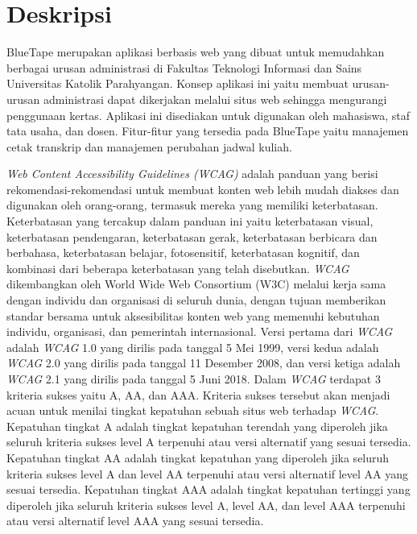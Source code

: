 \documentclass[a4paper,twoside]{article}
\begin{document}
\title{\@judultopik}
\author{\nama \textendash \@npm} 

\newcommand{\nama}{Hizkia Steven}
\newcommand{\@npm}{2015730020}
\newcommand{\@judultopik}{Kepatuhan dan Rekomendasi Perbaikan Web Content Accessibility Guideline untuk Aplikasi BlueTape} %
\newcommand{\jumpemb}{1} %
\newcommand{\tanggal}{25/08/2019}


\maketitle


\section{Deskripsi}
BlueTape merupakan aplikasi berbasis web yang dibuat untuk memudahkan berbagai urusan administrasi di Fakultas Teknologi Informasi dan Sains Universitas Katolik Parahyangan. Konsep aplikasi ini yaitu membuat urusan-urusan administrasi dapat dikerjakan melalui situs web sehingga mengurangi penggunaan kertas. Aplikasi ini disediakan untuk digunakan oleh mahasiswa, staf tata usaha, dan dosen. Fitur-fitur yang tersedia pada BlueTape yaitu manajemen cetak transkrip dan manajemen perubahan jadwal kuliah.

\textit{Web Content Accessibility Guidelines (WCAG)} adalah panduan yang berisi rekomendasi-rekomendasi untuk membuat konten web lebih mudah diakses dan digunakan oleh orang-orang, termasuk mereka yang memiliki keterbatasan. Keterbatasan yang tercakup dalam panduan ini yaitu keterbatasan visual, keterbatasan pendengaran, keterbatasan gerak, keterbatasan berbicara dan berbahasa, keterbatasan belajar, fotosensitif, keterbatasan kognitif, dan kombinasi dari beberapa keterbatasan yang telah disebutkan. \textit{WCAG} dikembangkan oleh World Wide Web Consortium (W3C) melalui kerja sama dengan individu dan organisasi di seluruh dunia, dengan tujuan memberikan standar bersama untuk aksesibilitas konten web yang memenuhi kebutuhan individu, organisasi, dan pemerintah internasional. Versi pertama dari \textit{WCAG} adalah \textit{WCAG} 1.0 yang dirilis pada tanggal 5 Mei 1999, versi kedua adalah \textit{WCAG} 2.0 yang dirilis pada tanggal 11 Desember 2008, dan versi ketiga adalah \textit{WCAG} 2.1 yang dirilis pada tanggal 5 Juni 2018. Dalam \textit{WCAG} terdapat 3 kriteria sukses yaitu A, AA, dan AAA. Kriteria sukses tersebut akan menjadi acuan untuk menilai tingkat kepatuhan sebuah situs web terhadap \textit{WCAG}. Kepatuhan tingkat A adalah tingkat kepatuhan terendah yang diperoleh jika seluruh kriteria sukses level A terpenuhi atau versi alternatif yang sesuai tersedia. Kepatuhan tingkat AA adalah tingkat kepatuhan yang diperoleh jika seluruh kriteria sukses level A dan level AA terpenuhi atau versi alternatif level AA yang sesuai tersedia. Kepatuhan tingkat AAA adalah tingkat kepatuhan tertinggi yang diperoleh jika seluruh kriteria sukses level A, level AA, dan level AAA terpenuhi atau versi alternatif level AAA yang sesuai tersedia.
\end{document}
